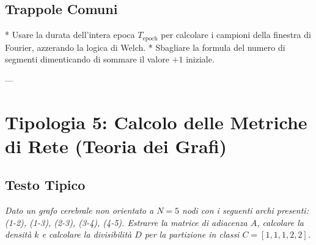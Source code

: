 \documentclass[10pt, letterpaper]{report}
\begin{document}
\subsection*{Trappole Comuni}
* Usare la durata dell'intera epoca $T_{\text{epoch}}$ per calcolare i campioni della finestra di Fourier, azzerando la logica di Welch.
* Sbagliare la formula del numero di segmenti dimenticando di sommare il valore $+1$ iniziale.

---

\section{Tipologia 5: Calcolo delle Metriche di Rete (Teoria dei Grafi)}

\subsection*{Testo Tipico}
\emph{Dato un grafo cerebrale non orientato a $N = 5$ nodi con i seguenti archi presenti: (1-2), (1-3), (2-3), (3-4), (4-5).
Estrarre la matrice di adiacenza $A$, calcolare la densità $k$ e calcolare la divisibilità $D$ per la partizione in classi $C = [1, 1, 1, 2, 2]$.}
\end{document}
